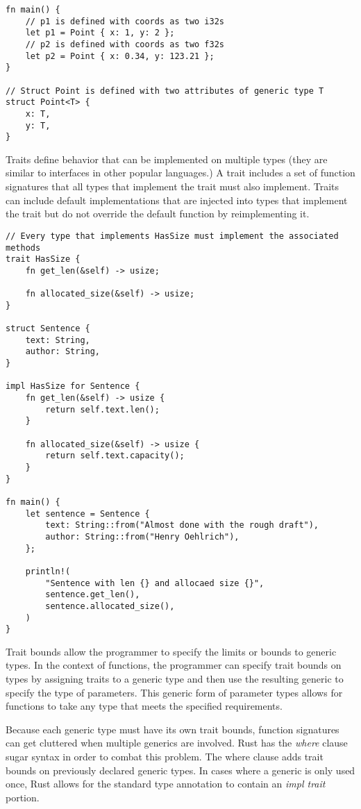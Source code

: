 \documentclass[12pt]{article}
\begin{document}
\singlespacing{}
\begin{verbatim}
fn main() {
    // p1 is defined with coords as two i32s
    let p1 = Point { x: 1, y: 2 };
    // p2 is defined with coords as two f32s
    let p2 = Point { x: 0.34, y: 123.21 };
}

// Struct Point is defined with two attributes of generic type T
struct Point<T> {
    x: T,
    y: T,
}
\end{verbatim}
\doublespacing{}

Traits define behavior that can be implemented on multiple types (they are
similar to interfaces in other popular languages.) A trait includes a set of
function signatures that all types that implement the trait must also
implement. Traits can include default implementations that are injected into
types that implement the trait but do not override the default function by
reimplementing it.

\singlespacing{}
\begin{verbatim}
// Every type that implements HasSize must implement the associated methods
trait HasSize {
    fn get_len(&self) -> usize;

    fn allocated_size(&self) -> usize;
}

struct Sentence {
    text: String,
    author: String,
}

impl HasSize for Sentence {
    fn get_len(&self) -> usize {
        return self.text.len();
    }

    fn allocated_size(&self) -> usize {
        return self.text.capacity();
    }
}

fn main() {
    let sentence = Sentence {
        text: String::from("Almost done with the rough draft"),
        author: String::from("Henry Oehlrich"),
    };

    println!(
        "Sentence with len {} and allocaed size {}",
        sentence.get_len(),
        sentence.allocated_size(),
    )
}
\end{verbatim}
\doublespacing{}

Trait bounds allow the programmer to specify the limits or bounds to generic
types. In the context of functions, the programmer can specify trait bounds on
types by assigning traits to a generic type and then use the resulting generic
to specify the type of parameters. This generic form of parameter types allows
for functions to take any type that meets the specified requirements.

Because each generic type must have its own trait bounds, function signatures
can get cluttered when multiple generics are involved. Rust has the
\textit{where} clause sugar syntax in order to combat this problem. The where
clause adds trait bounds on previously declared generic types. In cases where a
generic is only used once, Rust allows for the standard type annotation to
contain an \textit{impl trait} portion.
\end{document}
